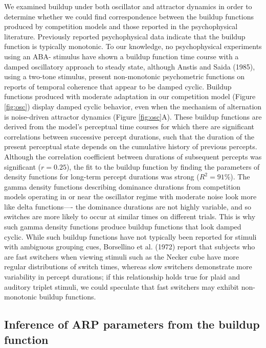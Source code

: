 We examined buildup under both oscillator and attractor dynamics in order to determine whether we could find correspondence between the buildup functions produced by competition models and those reported in the psychophysical literature. Previously reported psychophysical data indicate that the buildup function is typically monotonic. To our knowledge, no psychophysical experiments using an ABA- stimulus have shown a buildup function time course with a damped oscillatory approach to steady state, although Anstis and Saida (1985), using a two-tone stimulus, present non-monotonic psychometric functions on reports of temporal coherence that appear to be damped cyclic. Buildup functions produced with moderate adaptation in our competition model (Figure \ref{fig:osc}) display damped cyclic behavior, even when the mechanism of alternation is noise-driven attractor dynamics (Figure \ref{fig:osc}A). These buildup functions are derived from the model’s perceptual time courses for which there are significant correlations between successive percept durations, such that the duration of the present perceptual state depends on the cumulative history of previous percepts. Although the correlation coefficient between durations of subsequent percepts was significant ($r = 0.25$), the fit to the buildup function by finding the parameters of density functions for long-term percept durations was strong ($R^2 = 91$\%). The gamma density functions describing dominance durations from competition models operating in or near the oscillator regime with moderate noise look more like delta functions—- the dominance durations are not highly variable, and so switches are more likely to occur at similar times on different trials. This is why such gamma density functions produce buildup functions that look damped cyclic. While such buildup functions have not typically been reported for stimuli with ambiguous grouping cues, Borsellino et al. (1972) report that subjects who are fast switchers when viewing stimuli such as the Necker cube have more regular distributions of switch times, whereas slow switchers demonstrate more variability in percept durations; if this relationship holds true for plaid and auditory triplet stimuli, we could speculate that fast switchers may exhibit non-monotonic buildup functions.

\subsection{Inference of ARP parameters from the buildup function}


